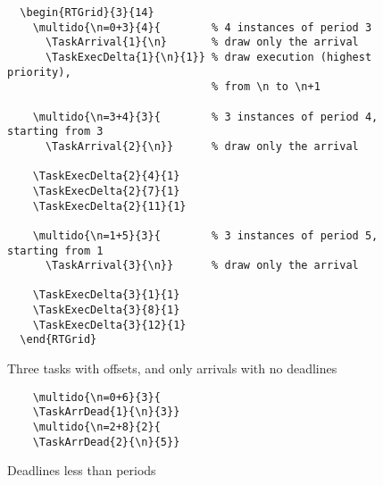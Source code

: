\documentclass{article}
\begin{document}
\begin{figure}[h]
  \centering
  \begin{RTGrid}{3}{14}
 

  \end{RTGrid}

\begin{verbatim}
  \begin{RTGrid}{3}{14}
    \multido{\n=0+3}{4}{        % 4 instances of period 3 
      \TaskArrival{1}{\n}       % draw only the arrival
      \TaskExecDelta{1}{\n}{1}} % draw execution (highest priority), 
                                % from \n to \n+1
 
    \multido{\n=3+4}{3}{        % 3 instances of period 4, starting from 3 
      \TaskArrival{2}{\n}}      % draw only the arrival

    \TaskExecDelta{2}{4}{1}
    \TaskExecDelta{2}{7}{1}
    \TaskExecDelta{2}{11}{1}

    \multido{\n=1+5}{3}{        % 3 instances of period 5, starting from 1 
      \TaskArrival{3}{\n}}      % draw only the arrival

    \TaskExecDelta{3}{1}{1}
    \TaskExecDelta{3}{8}{1}
    \TaskExecDelta{3}{12}{1}
  \end{RTGrid}
\end{verbatim}
  \caption{Three tasks with offsets, and only arrivals with no deadlines}
  \label{fig:ex1b}
\end{figure}

\begin{figure}[h]
  \centering
  \begin{RTGrid}[width=8cm]{2}{15}
  \end{RTGrid}
\begin{verbatim}
    \multido{\n=0+6}{3}{
    \TaskArrDead{1}{\n}{3}}
    \multido{\n=2+8}{2}{
    \TaskArrDead{2}{\n}{5}}
\end{verbatim}
  \caption{Deadlines less than periods}
  \label{fig:ex1c}
\end{figure}
\end{document}
